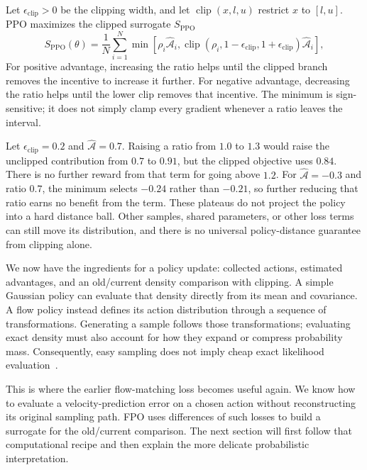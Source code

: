 Let $\epsilon_{\mathrm{clip}}>0$ be the clipping width, and let $\operatorname{clip}(x,l,u)$ restrict $x$ to $[l,u]$. PPO maximizes the clipped surrogate $S_{\mathrm{PPO}}$~\citep{ppo}
\begin{equation}
 S_{\mathrm{PPO}}(\theta)=\frac1N\sum_{i=1}^{N}
 \min\!\left[
 \rho_i\widehat{\mathcal A}_i,
 \operatorname{clip}(\rho_i,1-\epsilon_{\mathrm{clip}},1+\epsilon_{\mathrm{clip}})\widehat{\mathcal A}_i
 \right],
 \label{eq:ppo}
\end{equation}
For positive advantage, increasing the ratio helps until the clipped branch removes the incentive to increase it further. For negative advantage, decreasing the ratio helps until the lower clip removes that incentive. The minimum is sign-sensitive; it does not simply clamp every gradient whenever a ratio leaves the interval.

Let $\epsilon_{\mathrm{clip}}=0.2$ and $\widehat{\mathcal A}=0.7$. Raising a ratio from $1.0$ to $1.3$ would raise the unclipped contribution from $0.7$ to $0.91$, but the clipped objective uses $0.84$. There is no further reward from that term for going above $1.2$. For $\widehat{\mathcal A}=-0.3$ and ratio $0.7$, the minimum selects $-0.24$ rather than $-0.21$, so further reducing that ratio earns no benefit from the term. These plateaus do not project the policy into a hard distance ball. Other samples, shared parameters, or other loss terms can still move its distribution, and there is no universal policy-distance guarantee from clipping alone.

We now have the ingredients for a policy update: collected actions, estimated advantages, and an old/current density comparison with clipping. A simple Gaussian policy can evaluate that density directly from its mean and covariance. A flow policy instead defines its action distribution through a sequence of transformations. Generating a sample follows those transformations; evaluating exact density must also account for how they expand or compress probability mass. Consequently, easy sampling does not imply cheap exact likelihood evaluation~\citep{floworiginal,fpo}.

This is where the earlier flow-matching loss becomes useful again. We know how to evaluate a velocity-prediction error on a chosen action without reconstructing its original sampling path. FPO uses differences of such losses to build a surrogate for the old/current comparison. The next section will first follow that computational recipe and then explain the more delicate probabilistic interpretation.

